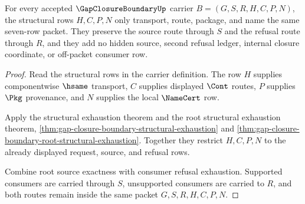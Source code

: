 \begin{theorem}
\label{thm:gap-closure-boundary-structural-transport-closure}
For every accepted $\GapClosureBoundaryUp$ carrier $B=(G,S,R,H,C,P,N)$, the structural rows $H,C,P,N$ only transport, route, package, and name the same seven-row packet. They preserve the source route through $S$ and the refusal route through $R$, and they add no hidden source, second refusal ledger, internal closure coordinate, or off-packet consumer row.
\end{theorem}
\begin{proof}
Read the structural rows in the carrier definition. The row $H$ supplies componentwise $\hsame$ transport, $C$ supplies displayed $\Cont$ routes, $P$ supplies $\Pkg$ provenance, and $N$ supplies the local $\NameCert$ row.

Apply the structural exhaustion theorem and the root structural exhaustion theorem, \autoref{thm:gap-closure-boundary-structural-exhaustion} and \autoref{thm:gap-closure-boundary-root-structural-exhaustion}. Together they restrict $H,C,P,N$ to the already displayed request, source, and refusal rows.

Combine root source exactness with consumer refusal exhaustion. Supported consumers are carried through $S$, unsupported consumers are carried to $R$, and both routes remain inside the same packet $G,S,R,H,C,P,N$.
\end{proof}


